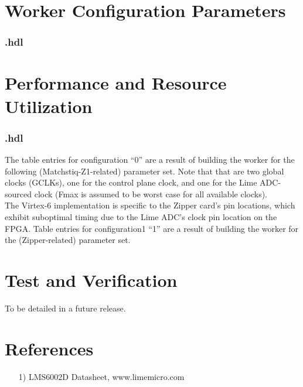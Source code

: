 \begin{landscape}
\section*{Worker Configuration Parameters}
\subsubsection*{\comp.hdl}
%
\section*{Performance and Resource Utilization}
\subsubsection*{\comp.hdl}
The table entries for configuration ``0'' are a result of building the worker for the following (Matchstiq-Z1-related) parameter set. Note that that are two global clocks (GCLKs), one for the control plane clock, and one for the Lime ADC-sourced clock (Fmax is assumed to be worst case for all available clocks).\\

The Virtex-6 implementation is specific to the Zipper card's pin locations, which exhibit suboptimal timing due to the Lime ADC's clock pin location on the FPGA. Table entries for configuration1 ``1'' are a result of building the worker for the (Zipper-related) parameter set.\\

%
\end{landscape}
\section*{Test and Verification}
\begin{flushleft}
 To be detailed in a future release.
\end{flushleft}
\section*{References}
\begin{flushleft}
	\begin{itemize}
		\item[1)] LMS6002D Datasheet, www.limemicro.com
	\end{itemize}
\end{flushleft}

